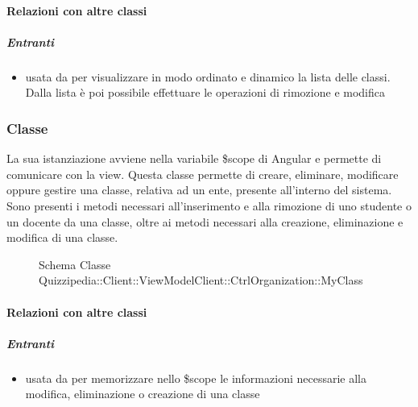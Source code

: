 \paragraph{Relazioni con altre classi}
\subparagraph{Entranti}
\begin{itemize}
\item usata da  per visualizzare in modo ordinato e dinamico la lista delle classi. Dalla lista è poi possibile effettuare le operazioni di rimozione e modifica
\end{itemize}
\subsubsection{Classe }
La sua istanziazione avviene nella variabile \$scope di Angular e permette di comunicare con la view. Questa classe permette di creare, eliminare, modificare oppure gestire una classe, relativa ad un ente, presente all'interno del sistema.
Sono presenti i metodi necessari all'inserimento e alla rimozione di uno studente o un docente da una classe, oltre ai metodi necessari alla creazione, eliminazione e modifica di una classe.
\begin{figure}[H]
\centering
\noindent{}
\caption[Schema Classe MyClass]{Schema Classe Quizzipedia::Client::ViewModelClient::CtrlOrganization::MyClass}
\end{figure}
\paragraph{Relazioni con altre classi}
\subparagraph{Entranti}
\begin{itemize}
\item usata da  per memorizzare nello \$scope le informazioni necessarie alla modifica, eliminazione o creazione di una classe
\end{itemize}
